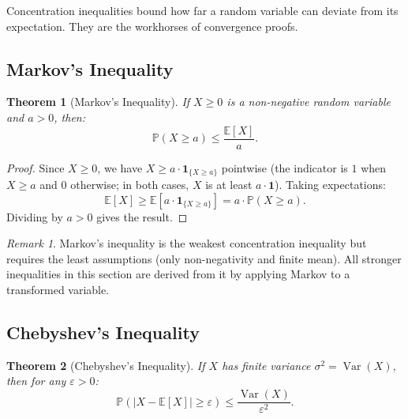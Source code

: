 \documentclass[11pt,a4paper]{article}
\theoremstyle{definition}
\theoremstyle{plain}
\newtheorem{theorem}{Theorem}[section]
\theoremstyle{remark}
\newtheorem{remark}{Remark}[section]
\DeclareMathOperator{\Var}{Var}
\newcommand{\E}{\mathbb{E}}
\newcommand{\Prob}{\mathbb{P}}
\newcommand{\indicator}{\mathbf{1}}
\begin{document}
Concentration inequalities bound how far a random variable can deviate from its expectation. They are the workhorses of convergence proofs.

\subsection{Markov's Inequality}
\label{subsec:markov}

\begin{keyresult}
\begin{theorem}[Markov's Inequality]
\label{thm:markov}
If $X \geq 0$ is a non-negative random variable and $a > 0$, then:
\begin{equation}
    \Prob(X \geq a) \leq \frac{\E[X]}{a}.
    \label{eq:markov}
\end{equation}
\end{theorem}
\end{keyresult}

\begin{proof}
Since $X \geq 0$, we have $X \geq a \cdot \indicator_{\{X \geq a\}}$ pointwise (the indicator is $1$ when $X \geq a$ and $0$ otherwise; in both cases, $X$ is at least $a \cdot \indicator$). Taking expectations:
\begin{equation}
    \E[X] \geq \E[a \cdot \indicator_{\{X \geq a\}}] = a \cdot \Prob(X \geq a).
\end{equation}
Dividing by $a > 0$ gives the result.
\end{proof}

\begin{remark}
Markov's inequality is the weakest concentration inequality but requires the least assumptions (only non-negativity and finite mean). All stronger inequalities in this section are derived from it by applying Markov to a transformed variable.
\end{remark}

\subsection{Chebyshev's Inequality}
\label{subsec:chebyshev}

\begin{keyresult}
\begin{theorem}[Chebyshev's Inequality]
\label{thm:chebyshev}
If $X$ has finite variance $\sigma^2 = \Var(X)$, then for any $\varepsilon > 0$:
\begin{equation}
    \Prob(|X - \E[X]| \geq \varepsilon) \leq \frac{\Var(X)}{\varepsilon^2}.
    \label{eq:chebyshev}
\end{equation}
\end{theorem}
\end{keyresult}
\end{document}
